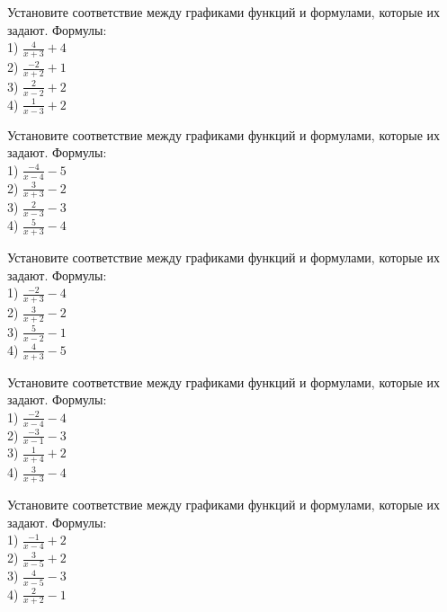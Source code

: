\documentclass[4apaper]{article}
\begin{document}
\begin{taskBN}{11}
Установите соответствие между графиками функций и формулами, которые их задают. Формулы: \\1) $\frac{4}{x+3}+4$\\2) $\frac{-2}{x+2}+1$\\3) $\frac{2}{x-2}+2$\\4) $\frac{1}{x-3}+2$
\end{taskBN}

\begin{taskBN}{12}
Установите соответствие между графиками функций и формулами, которые их задают. Формулы: \\1) $\frac{-4}{x-4}-5$\\2) $\frac{3}{x+3}-2$\\3) $\frac{2}{x-3}-3$\\4) $\frac{5}{x+3}-4$
\end{taskBN}

\begin{taskBN}{13}
Установите соответствие между графиками функций и формулами, которые их задают. Формулы: \\1) $\frac{-2}{x+3}-4$\\2) $\frac{3}{x+2}-2$\\3) $\frac{5}{x-2}-1$\\4) $\frac{4}{x+3}-5$
\end{taskBN}

\begin{taskBN}{14}
Установите соответствие между графиками функций и формулами, которые их задают. Формулы: \\1) $\frac{-2}{x-4}-4$\\2) $\frac{-3}{x-1}-3$\\3) $\frac{1}{x+4}+2$\\4) $\frac{3}{x+3}-4$
\end{taskBN}

\begin{taskBN}{15}
Установите соответствие между графиками функций и формулами, которые их задают. Формулы: \\1) $\frac{-1}{x-4}+2$\\2) $\frac{3}{x-5}+2$\\3) $\frac{4}{x-5}-3$\\4) $\frac{2}{x+2}-1$
\end{taskBN}
\end{document}
